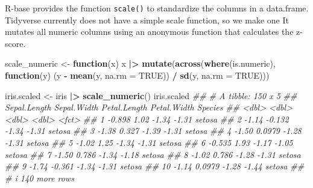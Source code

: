 \documentclass[
  notitlepage]{book}
\newenvironment{Shaded}{\begin{snugshade}}{\end{snugshade}}
\newcommand{\CommentTok}[1]{\textcolor[rgb]{0.56,0.35,0.01}{\textit{#1}}}
\newcommand{\ControlFlowTok}[1]{\textcolor[rgb]{0.13,0.29,0.53}{\textbf{#1}}}
\newcommand{\DataTypeTok}[1]{\textcolor[rgb]{0.13,0.29,0.53}{#1}}
\newcommand{\ErrorTok}[1]{\textcolor[rgb]{0.64,0.00,0.00}{\textbf{#1}}}
\newcommand{\KeywordTok}[1]{\textcolor[rgb]{0.13,0.29,0.53}{\textbf{#1}}}
\newcommand{\NormalTok}[1]{#1}
\newcommand{\OperatorTok}[1]{\textcolor[rgb]{0.81,0.36,0.00}{\textbf{#1}}}
\newcommand{\OtherTok}[1]{\textcolor[rgb]{0.56,0.35,0.01}{#1}}
\newcommand{\StringTok}[1]{\textcolor[rgb]{0.31,0.60,0.02}{#1}}
\begin{document}
R-base provides the function \texttt{scale()} to standardize the columns in a data.frame. Tidyverse currently does not have a simple scale function, so we
make one It mutates all numeric columns using an anonymous function
that calculates the z-score.

\begin{Shaded}
\begin{Highlighting}[]
\NormalTok{scale\_numeric \textless{}{-}}\StringTok{ }\ControlFlowTok{function}\NormalTok{(x) }
\NormalTok{  x }\OperatorTok{|}\ErrorTok{\textgreater{}}\StringTok{ }
\StringTok{  }\KeywordTok{mutate}\NormalTok{(}\KeywordTok{across}\NormalTok{(}\KeywordTok{where}\NormalTok{(is.numeric), }
                \ControlFlowTok{function}\NormalTok{(y) (y }\OperatorTok{{-}}\StringTok{ }\KeywordTok{mean}\NormalTok{(y, }\DataTypeTok{na.rm =} \OtherTok{TRUE}\NormalTok{)) }\OperatorTok{/}\StringTok{ }\KeywordTok{sd}\NormalTok{(y, }\DataTypeTok{na.rm =} \OtherTok{TRUE}\NormalTok{)))}
\end{Highlighting}
\end{Shaded}

\begin{Shaded}
\begin{Highlighting}[]
\NormalTok{iris.scaled \textless{}{-}}\StringTok{ }\NormalTok{iris }\OperatorTok{|}\ErrorTok{\textgreater{}}\StringTok{ }
\StringTok{  }\KeywordTok{scale\_numeric}\NormalTok{()}
\NormalTok{iris.scaled}
\CommentTok{\#\# \# A tibble: 150 x 5}
\CommentTok{\#\#    Sepal.Length Sepal.Width Petal.Length Petal.Width Species}
\CommentTok{\#\#           \textless{}dbl\textgreater{}       \textless{}dbl\textgreater{}        \textless{}dbl\textgreater{}       \textless{}dbl\textgreater{} \textless{}fct\textgreater{}  }
\CommentTok{\#\#  1       {-}0.898      1.02          {-}1.34       {-}1.31 setosa }
\CommentTok{\#\#  2       {-}1.14      {-}0.132         {-}1.34       {-}1.31 setosa }
\CommentTok{\#\#  3       {-}1.38       0.327         {-}1.39       {-}1.31 setosa }
\CommentTok{\#\#  4       {-}1.50       0.0979        {-}1.28       {-}1.31 setosa }
\CommentTok{\#\#  5       {-}1.02       1.25          {-}1.34       {-}1.31 setosa }
\CommentTok{\#\#  6       {-}0.535      1.93          {-}1.17       {-}1.05 setosa }
\CommentTok{\#\#  7       {-}1.50       0.786         {-}1.34       {-}1.18 setosa }
\CommentTok{\#\#  8       {-}1.02       0.786         {-}1.28       {-}1.31 setosa }
\CommentTok{\#\#  9       {-}1.74      {-}0.361         {-}1.34       {-}1.31 setosa }
\CommentTok{\#\# 10       {-}1.14       0.0979        {-}1.28       {-}1.44 setosa }
\CommentTok{\#\# \# i 140 more rows}
\end{Highlighting}
\end{Shaded}
\end{document}

